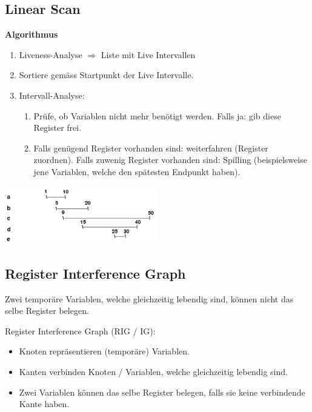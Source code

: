 \subsection{Linear Scan}

\textbf{Algorithmus}

\begin{enumerate}
	\item Liveness-Analyse $\Rightarrow$ Liste mit Live Intervallen
	\item Sortiere gemäss Startpunkt der Live Intervalle.
	\item Intervall-Analyse:
	\begin{enumerate}
		\item Prüfe, ob Variablen nicht mehr benötigt werden. Falls ja: gib diese
			Register frei.
		\item Falls genügend Register vorhanden sind: weiterfahren (Register
			zuordnen). Falls zuwenig Register vorhanden sind: Spilling (beispielsweise
			jene Variablen, welche den spätesten Endpunkt haben).
	\end{enumerate}
\end{enumerate}

\hspace{15mm} \includegraphics[width=0.5\textwidth]{images/liveness}


\subsection{Register Interference Graph}
\label{subsec:rig}

Zwei temporäre Variablen, welche gleichzeitig lebendig sind, können nicht das
selbe Register belegen.

Register Interference Graph (RIG / IG):

\begin{itemize}
	\item Knoten repräsentieren (temporäre) Variablen.
	\item Kanten verbinden Knoten / Variablen, welche gleichzeitig lebendig sind.
	\item Zwei Variablen können das selbe Register belegen, falls sie keine
		verbindende Kante haben.
\end{itemize}

